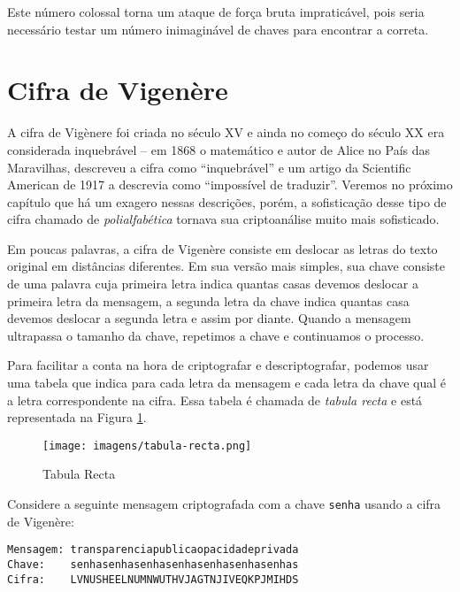 Este número colossal torna um ataque de força bruta impraticável, pois seria necessário testar um número inimaginável de chaves para encontrar a correta.



\section{Cifra de Vigenère}
\label{sec:cifra-de-vigenere}

A cifra de Vigènere foi criada no século XV e ainda no começo do século XX era considerada inquebrável -- em 1868 o matemático e autor de Alice no País das Maravilhas, descreveu a cifra como ``inquebrável'' e um artigo da Scientific American de 1917 a descrevia como ``impossível de traduzir''.
Veremos no próximo capítulo que há um exagero nessas descrições, porém, a sofisticação desse tipo de cifra chamado de {\em polialfabética} tornava sua criptoanálise muito mais sofisticado.

Em poucas palavras, a cifra de Vigenère consiste em deslocar as letras do texto original em distâncias diferentes.
Em sua versão mais simples, sua chave consiste de uma palavra cuja primeira letra indica quantas casas devemos deslocar a primeira letra da mensagem, a segunda letra da chave indica quantas casa devemos deslocar a segunda letra e assim por diante.
Quando a mensagem ultrapassa o tamanho da chave, repetimos a chave e continuamos o processo.

Para facilitar a conta na hora de criptografar e descriptografar, podemos usar uma tabela que indica para cada letra da mensagem e cada letra da chave qual é a letra correspondente na cifra.
Essa tabela é chamada de {\em tabula recta} e está representada na Figura \ref{fig:tabula-recta}.

\begin{figure}[htbp]
  \centering
  \texttt{[image: imagens/tabula-recta.png]}
  \caption{Tabula Recta}
  \label{fig:tabula-recta}
\end{figure}


\begin{example}
  Considere a seguinte mensagem criptografada com a chave {\tt senha} usando a cifra de Vigenère:

\begin{verbatim}
Mensagem: transparenciapublicaopacidadeprivada
Chave:    senhasenhasenhasenhasenhasenhasenhas
Cifra:    LVNUSHEELNUMNWUTHVJAGTNJIVEQKPJMIHDS
\end{verbatim}
\end{example}

